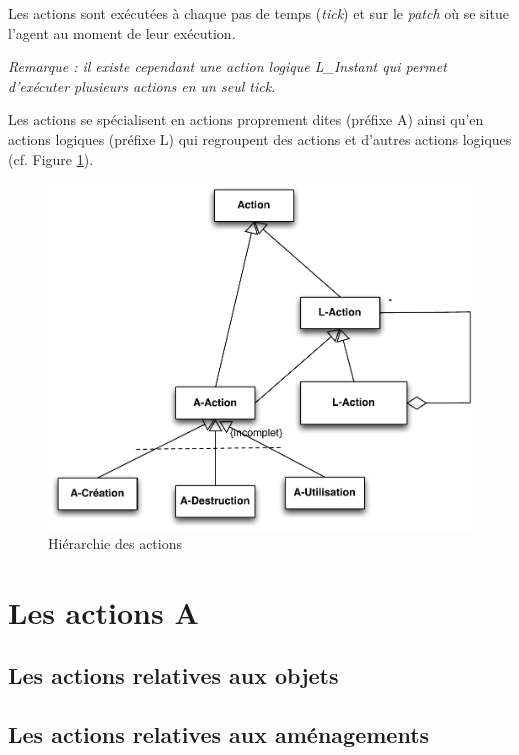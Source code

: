 	
	Les actions sont exécutées à chaque pas de temps (\textit{tick}) et sur le \textit{patch} où se situe l'agent au moment de leur exécution.
	
	\textit{Remarque : il existe cependant une action logique L\_Instant qui permet d'exécuter plusieurs actions en un seul tick.}
	
	Les actions se spécialisent en actions proprement dites (préfixe A) ainsi qu'en actions logiques (préfixe L) qui regroupent des actions et d'autres actions logiques (cf. Figure \ref{HA}).
	
	\begin{figure}[!h]
	\begin{center}
	\includegraphics[scale=0.5]{DocumentationActions/HA.pdf}
	\caption[HA]{Hiérarchie des actions \\}
	\label{HA}
	\end{center}
	\end{figure}
\newpage
\section{Les actions A}
	\subsection{Les actions relatives aux objets}
	
	
	\subsection{Les actions relatives aux aménagements}
	
	
